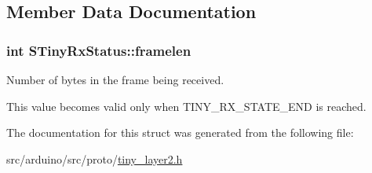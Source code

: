 \subsection{Member Data Documentation}
\hypertarget{structSTinyRxStatus_ad9f6055b8e74f10894c48ff2247f51c4}{}
\subsubsection[{framelen}]{\setlength{\rightskip}{0pt plus 5cm}int S\+Tiny\+Rx\+Status\+::framelen}\label{structSTinyRxStatus_ad9f6055b8e74f10894c48ff2247f51c4}


Number of bytes in the frame being received. 

This value becomes valid only when T\+I\+N\+Y\+\_\+\+R\+X\+\_\+\+S\+T\+A\+T\+E\+\_\+\+E\+N\+D is reached. 

The documentation for this struct was generated from the following file\+:\begin{DoxyCompactItemize}
\item 
src/arduino/src/proto/\hyperlink{src_2arduino_2src_2proto_2tiny__layer2_8h}{tiny\+\_\+layer2.\+h}\end{DoxyCompactItemize}

